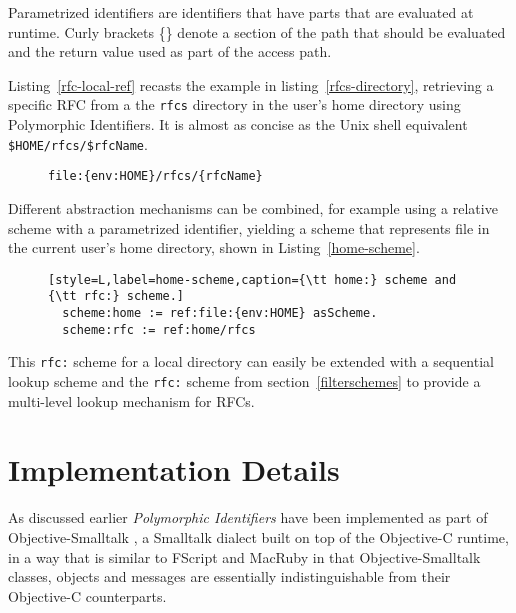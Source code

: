 \documentclass[preprint,authoryear]{llncs}
\begin{document}
Parametrized identifiers are identifiers that have parts that are evaluated
at runtime.  Curly brackets \{\} denote a section of the path that should be evaluated and
the return value used as part of the access path.

Listing~\ref{rfc-local-ref} recasts the example in listing~\ref{rfcs-directory}, retrieving a specific RFC from a 
the {\tt rfcs} directory in the user's home directory using Polymorphic Identifiers.  It is almost
as concise as the Unix shell equivalent {\tt \$HOME/rfcs/\$rfcName}.

\begin{figure}[htbp]
\begin{lstlisting}[style=L,label=rfc-local-ref,caption=Parametrized identifier for local RFC access.]
file:{env:HOME}/rfcs/{rfcName}
\end{lstlisting}
\end{figure}


Different abstraction mechanisms can be combined, for example using a
relative scheme with a parametrized identifier, yielding
a scheme that represents file in the current user's home directory, shown
in Listing~\ref{home-scheme}.


\begin{figure}[htbp]
\begin{lstlisting}[style=L,label=home-scheme,caption={\tt home:} scheme and {\tt rfc:} scheme.]
  scheme:home := ref:file:{env:HOME} asScheme.
  scheme:rfc := ref:home/rfcs
\end{lstlisting}
\end{figure}

This {\tt rfc:} scheme for a local directory can easily be extended with a sequential lookup scheme
and the {\tt rfc:} scheme from section~\ref{filterschemes} to provide a multi-level lookup mechanism
for RFCs.



\section{Implementation Details}
\label{implementation}

As discussed earlier \emph{Polymorphic Identifiers} have been implemented as part of Objective-Smalltalk \cite{objst},
a Smalltalk dialect built on top of the Objective-C\cite{objc-evol}\cite{objc-apple} runtime, 
in a way that is similar to FScript\cite{fscript} and MacRuby \cite{macruby} in that Objective-Smalltalk classes,
objects and messages are essentially indistinguishable from their Objective-C counterparts.
\end{document}
